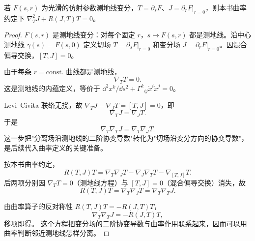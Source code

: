 \begin{proposition}
若 $F(s,r)$ 为光滑的仿射参数测地线变分，$T=\partial_sF$、$J=\partial_rF|_{r=0}$，则本书曲率约定下 $\nabla_T^2J+R(J,T)T=0$。
\end{proposition}

\begin{proof}
$F(s,r)$ 是测地线变分：对每个固定 $r$，$s\mapsto F(s,r)$ 都是测地线。沿中心测地线 $\gamma(s)=F(s,0)$ 定义切场 $T=\partial_sF|_{r=0}$ 和变分场 $J=\partial_rF|_{r=0}$。因混合偏导交换，$[T,J]=0$。

由于每条 $r=\mathrm{const.}$ 曲线都是测地线，
\begin{equation*}
 \nabla_TT=0.
\end{equation*}
这是测地线的内蕴定义，等价于 $\dd^2 x^k/\dd s^2+\Gamma^k{}_{ij}\dot x^i\dot x^j=0$。

Levi--Civita 联络无挠，故 $\nabla_TJ-\nabla_JT=[T,J]=0$，即
\begin{equation*}
 \nabla_TJ=\nabla_JT.
\end{equation*}
于是
\begin{equation*}
 \nabla_T\nabla_TJ=\nabla_T\nabla_JT.
\end{equation*}
这一步把"分离场沿测地线的二阶协变导数"转化为"切场沿变分方向的协变导数"，是后续代入曲率定义的关键准备。

按本书曲率约定，
\begin{equation*}
 R(T,J)T
 =\nabla_T\nabla_JT-\nabla_J\nabla_TT-\nabla_{[T,J]}T.
\end{equation*}
后两项分别因 $\nabla_TT=0$（测地线方程）与 $[T,J]=0$（混合偏导交换）消失，故
\begin{equation*}
 R(T,J)T=\nabla_T\nabla_JT=\nabla_T\nabla_TJ.
\end{equation*}

由曲率算子的反对称性 $R(T,J)T=-R(J,T)T$，
\begin{equation*}
 \nabla_T\nabla_TJ=-R(J,T)T,
\end{equation*}
移项即得。
这个方程把变分场的二阶协变导数与曲率作用联系起来，因而可以用曲率判断邻近测地线怎样分离。
\end{proof}

